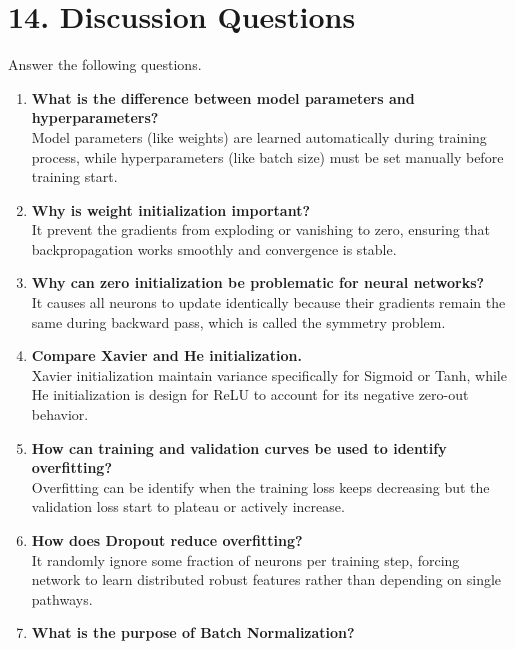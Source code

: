 \documentclass[10pt]{article}
\begin{document}
\section*{14. Discussion Questions}

Answer the following questions.

\begin{enumerate}
\item \textbf{What is the difference between model parameters and hyperparameters?} \\
Model parameters (like weights) are learned automatically during training process, while hyperparameters (like batch size) must be set manually before training start.
\vspace{2mm}
\item \textbf{Why is weight initialization important?} \\
It prevent the gradients from exploding or vanishing to zero, ensuring that backpropagation works smoothly and convergence is stable.
\vspace{2mm}
\item \textbf{Why can zero initialization be problematic for neural networks?} \\
It causes all neurons to update identically because their gradients remain the same during backward pass, which is called the symmetry problem.
\vspace{2mm}
\item \textbf{Compare Xavier and He initialization.} \\
Xavier initialization maintain variance specifically for Sigmoid or Tanh, while He initialization is design for ReLU to account for its negative zero-out behavior.
\vspace{2mm}
\item \textbf{How can training and validation curves be used to identify overfitting?} \\
Overfitting can be identify when the training loss keeps decreasing but the validation loss start to plateau or actively increase.
\vspace{2mm}
\item \textbf{How does Dropout reduce overfitting?} \\
It randomly ignore some fraction of neurons per training step, forcing network to learn distributed robust features rather than depending on single pathways.
\vspace{2mm}
\item \textbf{What is the purpose of Batch Normalization?} \\

\end{enumerate}
\end{document}
